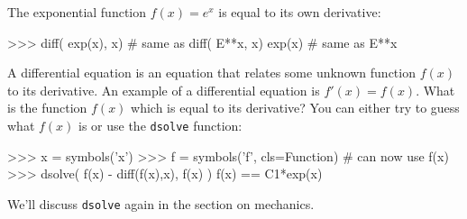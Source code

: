 
\noindent
The exponential function $f(x)=e^x$ is equal to its own derivative:

\small
\begin{verbatimtab}
>>> diff( exp(x), x)     # same as diff( E**x, x)
exp(x)                   # same as E**x
\end{verbatimtab}
\normalsize

\noindent
A differential equation is an equation that relates some unknown function $f(x)$ to its derivative. 
An example of a differential equation is $f'(x)=f(x)$.
What is the function $f(x)$ which is equal to its derivative?
You can either try to guess what $f(x)$ is or use the \texttt{dsolve} function:

\small
\begin{verbatimtab}
>>> x = symbols('x')
>>> f = symbols('f', cls=Function)        # can now use f(x)
>>> dsolve( f(x) - diff(f(x),x), f(x) )
f(x) == C1*exp(x)
\end{verbatimtab}
\normalsize

\noindent
We'll discuss \texttt{dsolve} again in the section on mechanics.
